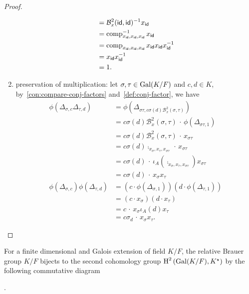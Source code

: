 \begin{proof}
\begin{enumerate}
\[\begin{aligned}
            &= \mathcal{B}^{2}_{x}(\mathsf{id},\mathsf{id})^{-1} x_{\mathsf{id}} \\
            &= \operatorname{comp}_{x_{\mathsf{id}},x_{\mathsf{id}},x_{\mathsf{id}}}^{-1} x_{\mathsf{id}} \\
            &= \operatorname{comp}_{x_{\mathsf{id}},x_{\mathsf{id}},x_{\mathsf{id}}} x_{\mathsf{id}} x_{\mathsf{id}} x_{\mathsf{id}}^{-1} \\
            &= x_{\mathsf{id}} x_{\mathsf{id}}^{-1} \\
            &= 1.
          \end{aligned}
          \]
    \item preservation of multiplication: let $\sigma,\tau\in\operatorname{Gal}(K/F)$ and $c,d \in K$, by~\cref{con:compare-conj-factors} and~\cref{def:conj-factor}, we have
          \[
          \begin{aligned}
            \phi\left(\Delta_{\sigma,c}\Delta_{\tau,d}\right)
            &= \phi\left(\Delta_{\sigma\tau, c\sigma(d)\mathcal{B}^{2}_{x}(\sigma,\tau)}\right) \\
            &= c\sigma(d)\mathcal{B}^{2}_{x}(\sigma,\tau) \,\cdot\, \phi\left(\Delta_{\sigma\tau, 1}\right) \\
            &= c\sigma(d)\mathcal{B}^{2}_{x}(\sigma,\tau) \,\cdot\, x_{\sigma\tau} \\
            &= c\sigma(d)\comp_{x_{\sigma},x_{\tau},x_{\sigma\tau}} \,\cdot\, x_{\sigma\tau} \\
            &= c\sigma(d)\,\cdot\, \iota_{A}\left(\comp_{x_{\sigma},x_{\tau},x_{\sigma\tau}}\right)x_{\sigma\tau} \\
            &= c\sigma(d) \,\cdot\, x_{\sigma}x_{\tau}\\
            \phi\left(\Delta_{\sigma,c}\right)\phi\left(\Delta_{\tau,d}\right)
            &=\left(c \cdot \phi\left(\Delta_{\sigma, 1}\right)\right)
              \left(d \cdot \phi\left(\Delta_{\tau, 1}\right)\right) \\
            &= \left(c \cdot x_{\sigma}\right) \left(d \cdot x_{\tau}\right)\\
            &= c \,\cdot\, x_{\sigma}\iota_{A}(d) x_{\tau} \\
            &= c\sigma_{d} \,\cdot\, x_{\sigma}x_{\tau}.
          \end{aligned}
          \]
  \end{enumerate}
\end{proof}

\begin{corollary}\label{cor:relative-br-2nd-coh-bij}
  For a finite dimensional and Galois extension of field $K/F$, the relative Brauer group $K/F$ bijects to the second cohomology group $\operatorname{H}^{2}\left(\operatorname{Gal}(K/F), K^{\star}\right)$ by the following commutative diagram
  \begin{center}
  .
\end{center}
\leanok
{}
\end{corollary}

